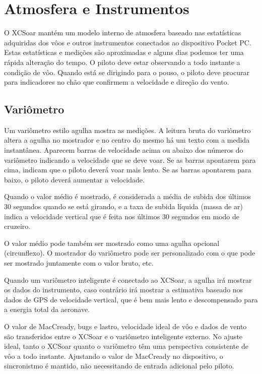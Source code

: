 \chapter{Atmosfera e Instrumentos}\label{cha:atmosph}
O XCSoar mantém um modelo interno de atmosfera baseado nas estatísticas adquiridas dos vôos e outros instrumentos conectados ao dispositivo Pocket PC.  Estas estatísticas e medições são aproximadas e alguns dias podemos ter uma rápida alteração do tempo.  O piloto deve estar observando a todo instante a condição de vôo.  Quando está se dirigindo para o pouso, o piloto deve procurar para indicadores no chão que confirmem a velocidade e direção do vento.

\section{Variômetro}\label{sec:variometer}

Um variômetro estilo agulha mostra as medições.  A leitura bruta do variômetro altera a agulha no mostrador e no centro do mesmo há um texto com a medida instantânea.  Aparecem barras de velocidade acima ou abaixo dos números do variômetro indicando a velocidade que se deve voar.  Se as barras apontarem para cima, indicam que o piloto deverá voar mais lento.  Se as barras apontarem para baixo, o piloto deverá aumentar a velocidade.

Quando o valor médio é mostrado, é considerada a média de subida dos últimos 30 segundos quando se está girando, e a taxa de subida líquida (massa de ar) indica a velocidade vertical que é feita nos últimos 30 segundos em modo de cruzeiro.



O valor médio pode também ser mostrado como uma agulha opcional (circunflexo).  O mostrador do variômetro pode ser personalizado  com o que pode ser mostrado juntamente com o valor bruto, etc.

Quando um variômetro inteligente é conectado ao XCSoar, a agulha irá mostrar os dados do instrumento, caso contrário irá mostrar a estimativa baseado nos dados de GPS de velocidade vertical, que é bem mais lento e descompensado para a energia total da aeronave.

O valor de MacCready, bugs e lastro, velocidade ideal de vôo e dados de vento são transferidos entre o XCSoar e o variômetro inteligente externo.  No ajuste ideal, tanto o XCSoar quanto o variômetro têm uma perspectiva consistente de vôo a todo instante.  Ajustando o valor de MacCready no dispositivo, o sincronistmo é mantido, não necessitando de entrada adicional pelo piloto.

